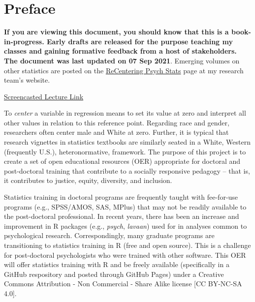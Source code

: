 \documentclass[
  english,
]{book}
\begin{document}
\hypertarget{preface}{%
\chapter*{Preface}\label{preface}}

\textbf{If you are viewing this document, you should know that this is a book-in-progress. Early drafts are released for the purpose teaching my classes and gaining formative feedback from a host of stakeholders. The document was last updated on 07 Sep 2021}. Emerging volumes on other statistics are posted on the \href{https://lhbikos.github.io/BikosRVT/ReCenter.html}{ReCentering Psych Stats} page at my research team's website.

\href{https://spu.hosted.panopto.com/Panopto/Pages/Viewer.aspx?id=c932455e-ef06-444a-bdca-acf7012d759a}{Screencasted Lecture Link}

To \emph{center} a variable in regression means to set its value at zero and interpret all other values in relation to this reference point. Regarding race and gender, researchers often center male and White at zero. Further, it is typical that research vignettes in statistics textbooks are similarly seated in a White, Western (frequently U.S.), heteronormative, framework. The purpose of this project is to create a set of open educational resources (OER) appropriate for doctoral and post-doctoral training that contribute to a socially responsive pedagogy -- that is, it contributes to justice, equity, diversity, and inclusion.

Statistics training in doctoral programs are frequently taught with fee-for-use programs (e.g., SPSS/AMOS, SAS, MPlus) that may not be readily available to the post-doctoral professional. In recent years, there has been an increase and improvement in R packages (e.g., \emph{psych}, \emph{lavaan}) used for in analyses common to psychological research. Correspondingly, many graduate programs are transitioning to statistics training in R (free and open source). This is a challenge for post-doctoral psychologists who were trained with other software. This OER will offer statistics training with R and be freely available (specifically in a GitHub respository and posted through GitHub Pages) under a Creative Commons Attribution - Non Commercial - Share Alike license {[}CC BY-NC-SA 4.0{]}.
\end{document}
